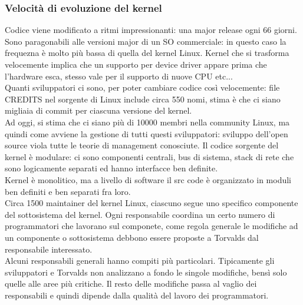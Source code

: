 \documentclass[12pt, oneside]{extbook}
\begin{document}
\subsubsection{Velocità di evoluzione del kernel}
Codice viene modificato a ritmi impressionanti: una major release ogni 66 giorni. Sono paragonabili alle versioni major di un SO commerciale: in questo caso la frequezna è molto più bassa di quella del kernel Linux. Kernel che si trasforma velocemente implica che un supporto per device driver appare prima che l'hardware esca, stesso vale per il supporto di nuove CPU etc...\\ Quanti sviluppatori ci sono, per poter cambiare codice così velocemente: file CREDITS nel sorgente di Linux include circa 550 nomi, stima è  che ci siano migliaia di commit per ciascuna versione del kernel.\\ Ad oggi, si stima che ci siano più di 10000 membri nella community Linux, ma quindi come avviene la gestione di tutti  questi sviluppatori: sviluppo dell'open source viola tutte le teorie di management conosciute. Il codice sorgente del kernel è modulare: ci sono componenti centrali, bus di sistema, stack di rete che sono logicamente separati ed hanno interfacce ben definite.\\ Kernel è monolitico, ma a livello di software il src code è organizzato in moduli ben definiti e ben separati fra loro.\\ Circa 1500 maintainer del kernel Linux, ciascuno segue uno specifico componente del sottosistema del kernel. Ogni responsabile coordina un certo numero di programmatori che lavorano sul componete, come regola generale le modifiche ad un componente o sottosistema debbono essere proposte a Torvalds dal responsabile interessato.\\ Alcuni responsabili generali hanno compiti più particolari. Tipicamente gli sviluppatori e Torvalds non analizzano a fondo le singole modifiche, bensì solo quelle alle aree più critiche. Il resto delle modifiche passa al vaglio dei responsabili e quindi dipende dalla qualità del lavoro dei programmatori.
\end{document}
